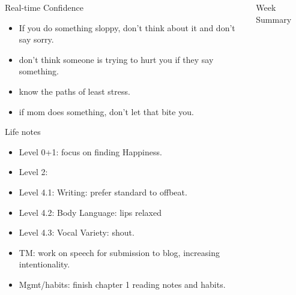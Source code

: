 \documentclass[serif, mathserif, final]{beamer}
\begin{document}
\begin{frame}{}
\begin{columns}
\begin{column}{0.25\linewidth}
      \begin{block}{Real-time Confidence}
        \begin{itemize}
          \tiny \item \tiny If you do something sloppy, don't
          think about it and don't say sorry. 
        \item \tiny don't think someone is trying to hurt you if
          they say something.
        \item \tiny know the paths of least stress. 
        \item \tiny if mom does something, don't let that bite you. 
        \end{itemize}
      \end{block}
      
      \begin{block}{Life notes} 
        \begin{itemize} 
          \tiny \item \tiny Level 0+1: focus on finding Happiness. 
        \item \tiny Level 2: 
        \item \tiny Level 4.1: Writing: prefer standard to offbeat. 
        \item \tiny Level 4.2: Body Language: lips relaxed
        \item \tiny Level 4.3: Vocal Variety: shout. 
        \item \tiny TM: work on speech for submission to blog, increasing intentionality. 
        \item \tiny Mgmt/habits: finish chapter 1 reading notes and habits. 
        \end{itemize}     
      \end{block}
    \end{column} %
    
    \begin{column}{0.50\linewidth}
      \begin{block}{Week Summary}


\end{block}
\end{column}
\end{columns}
\end{frame}
\end{document}
